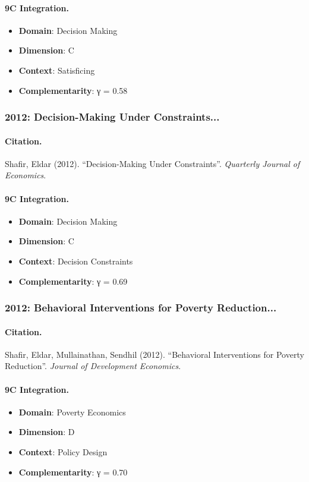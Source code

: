 \paragraph{9C Integration.}
\begin{itemize}[nosep]
  \item \textbf{Domain}: Decision Making
  \item \textbf{Dimension}: C
  \item \textbf{Context}: Satisficing
  \item \textbf{Complementarity}: γ = 0.58
\end{itemize}


\subsubsection{2012: Decision-Making Under Constraints...}

\paragraph{Citation.}
Shafir, Eldar (2012). ``Decision-Making Under Constraints''. \textit{Quarterly Journal of Economics}.

\paragraph{9C Integration.}
\begin{itemize}[nosep]
  \item \textbf{Domain}: Decision Making
  \item \textbf{Dimension}: C
  \item \textbf{Context}: Decision Constraints
  \item \textbf{Complementarity}: γ = 0.69
\end{itemize}


\subsubsection{2012: Behavioral Interventions for Poverty Reduction...}

\paragraph{Citation.}
Shafir, Eldar, Mullainathan, Sendhil (2012). ``Behavioral Interventions for Poverty Reduction''. \textit{Journal of Development Economics}.

\paragraph{9C Integration.}
\begin{itemize}[nosep]
  \item \textbf{Domain}: Poverty Economics
  \item \textbf{Dimension}: D
  \item \textbf{Context}: Policy Design
  \item \textbf{Complementarity}: γ = 0.70
\end{itemize}


